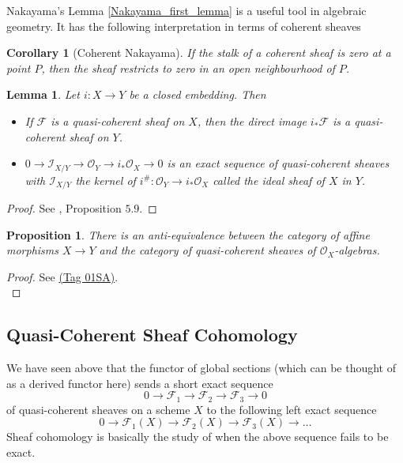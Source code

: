 \documentclass{article}
\theoremstyle{plain}
\newtheorem{proposition}[theorem]{Proposition}
\newtheorem{lemma}[theorem]{Lemma}
\newtheorem{corollary}[theorem]{Corollary}
\theoremstyle{definition}
\begin{document}
\noindent Nakayama's Lemma \ref{Nakayama_first_lemma} is a useful tool in algebraic geometry. 
It has the following interpretation in terms of coherent sheaves 
\begin{corollary}[Coherent Nakayama]
    If the stalk of a coherent sheaf is zero at a point $P$, then the sheaf restricts to zero in an open neighbourhood of $P$.
\end{corollary}



\begin{lemma}
\label{ideal_sheaf}
    Let $i: X \rightarrow Y$ be a closed embedding. Then
    \begin{itemize}
        \item[a)] If $\mathcal{F}$ is a quasi-coherent sheaf on $X$, then the direct image $i_*\mathcal{F}$ is a quasi-coherent sheaf on $Y$.
        \item[b)] $0 \rightarrow \mathcal{I}_{X/Y} \rightarrow\mathcal{O}_{Y}\rightarrow i_*\mathcal{O}_X\rightarrow0$ is an exact sequence of quasi-coherent sheaves with $\mathcal{I}_{X/Y}$ the kernel of $i^{\#}:\mathcal{O}_Y\rightarrow i_*\mathcal{O}_X$ called the ideal sheaf of $X$ in $Y$.
    \end{itemize}
\end{lemma}
\begin{proof}
    See \cite{Hartshorne}, Proposition $5.9$.
\end{proof}






\begin{proposition}
\label{affine_morph_quasi_coherent}
    There is an anti-equivalence between the category of affine morphisms $X\rightarrow Y$ and the category of quasi-coherent sheaves of $\mathcal{O}_X$-algebras.
\end{proposition}
\begin{proof}
    See \cite{Stacks} \href{https://stacks.math.columbia.edu/tag/01SA}{(Tag 01SA)}.\\
\end{proof}






\subsection{Quasi-Coherent Sheaf Cohomology}
\label{Sheaf_cohomology}


We have seen above that the functor of global sections (which can be thought of as a derived functor here) sends a short exact sequence 
$$0\rightarrow \mathcal{F}_1 \rightarrow \mathcal{F}_2 \rightarrow \mathcal{F}_3 \rightarrow 0$$
of quasi-coherent sheaves on a scheme $X$ to the following left exact sequence 
$$0\rightarrow \mathcal{F}_1(X) \rightarrow \mathcal{F}_2(X) \rightarrow \mathcal{F}_3(X) \rightarrow \dots$$
Sheaf cohomology is basically the study of when the above sequence fails to be exact.
\end{document}
